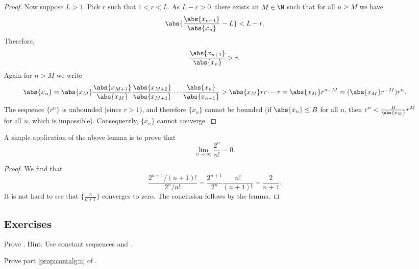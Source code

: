 \documentclass[12pt]{book}
\begin{document}
\begin{proof}
Now suppose $L > 1$.
Pick
$r$ such that $1 < r < L$.
As $L-r > 0$,
there exists an $M \in \N$ such that for
all $n \geq M$ we have
\begin{equation*}
\abs{\frac{\abs{x_{n+1}}}{\abs{x_n}} - L} < L-r .
\end{equation*}
Therefore,
\begin{equation*}
\frac{\abs{x_{n+1}}}{\abs{x_n}} > r .
\end{equation*}
Again for $n > M$
we write
\begin{equation*}
\abs{x_n} =
\abs{x_M}
\frac{\abs{x_{M+1}}}{\abs{x_{M}}}
\frac{\abs{x_{M+2}}}{\abs{x_{M+1}}}
\cdots
\frac{\abs{x_{n}}}{\abs{x_{n-1}}}
>
\abs{x_M}
r r \cdots r = \abs{x_M} r^{n-M} = (\abs{x_M} r^{-M}) r^n .
\end{equation*}
The sequence $\{ r^n \}$ is unbounded (since $r > 1$), and therefore
$\{x_n\}$ cannot be bounded (if $\abs{x_n} \leq B$ for all $n$, then
$r^n < \frac{B}{\abs{x_M}} r^{M}$ for all $n$, which is impossible).
Consequently, $\{ x_n \}$ cannot converge.
\end{proof}

\begin{example}
A simple application of the above lemma is to prove that
\begin{equation*}
\lim_{n\to\infty} \frac{2^n}{n!} = 0 .
\end{equation*}

\begin{proof}
We find that
\begin{equation*}
\frac{2^{n+1} / (n+1)!}{2^n/n!}
=
\frac{2^{n+1}}{2^n}\frac{n!}{(n+1)!}
=
\frac{2}{n+1} .
\end{equation*}
It is not hard to see that $\{ \frac{2}{n+1} \}$ converges to zero.
The conclusion follows by the lemma.
\end{proof}
\end{example}

\subsection*{Exercises}

\begin{exercise}
Prove .
Hint: Use constant sequences
and .
\end{exercise}

\begin{exercise}
Prove part \ref{prop:contalg:ii} of .
\end{exercise}
\end{document}
